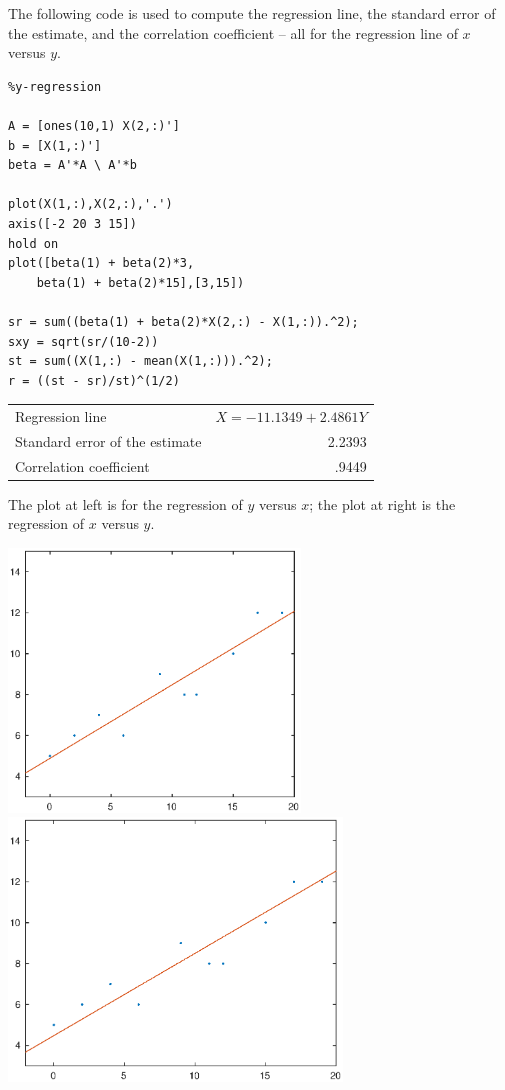 \documentclass[12pt]{amsart}
\begin{document}
\begin{enumerate}
\pagebreak

The following code is used to compute the regression line,
the standard error of the estimate, and the correlation coefficient
-- all for the regression line of $x$ versus $y$.



\begin{verbatim}
%y-regression

A = [ones(10,1) X(2,:)']
b = [X(1,:)']
beta = A'*A \ A'*b

plot(X(1,:),X(2,:),'.')
axis([-2 20 3 15])
hold on 
plot([beta(1) + beta(2)*3,
    beta(1) + beta(2)*15],[3,15])

sr = sum((beta(1) + beta(2)*X(2,:) - X(1,:)).^2);
sxy = sqrt(sr/(10-2))
st = sum((X(1,:) - mean(X(1,:))).^2);
r = ((st - sr)/st)^(1/2)
\end{verbatim}

\vspace{5mm}


\begin{tabular}{lr}
Regression line & $X = -11.1349 + 2.4861Y$ \\
Standard error of the estimate & 2.2393 \\
Correlation coefficient & .9449 \\
\end{tabular}

\vspace{5mm}

The plot at left is for the regression of $y$ versus $x$; the plot
at right is the regression of $x$ versus $y$.

\includegraphics[width=.45\textwidth, height=7cm]{p1xline.eps}
\includegraphics[width=.45\textwidth, height= 7cm]{p1yline.eps}



\end{enumerate}
\end{document}
